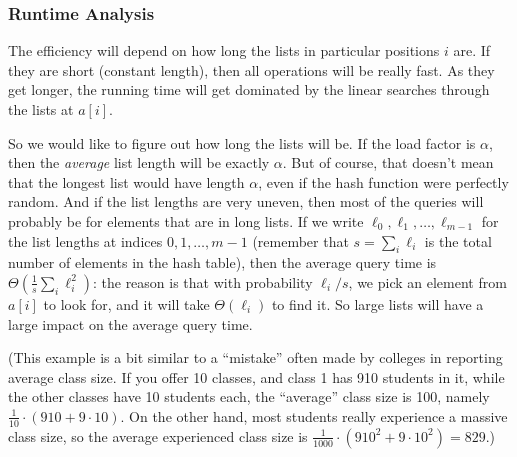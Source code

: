 \subsubsection{Runtime Analysis}
The efficiency will depend on how long the lists in
particular positions $i$ are. 
If they are short (constant length), then all operations will be
really fast. As they get longer, the running time will get dominated
by the linear searches through the lists at $a[i]$.

So we would like to figure out how long the lists will be.
If the load factor is $\alpha$, then the \emph{average} list length
will be exactly $\alpha$. But of course, that doesn't mean that the
longest list would have length $\alpha$, even if the hash function were
perfectly random. 
And if the list lengths are very uneven, then most of the queries will
probably be for elements that are in long lists. 
If we write $\ell_0, \ell_1, \ldots, \ell_{m-1}$ for the list lengths
at indices $0, 1, \ldots, m-1$ (remember that $s=\sum_i \ell_i$ is the
total number of elements in the hash table), then the average query time is
$\Theta(\frac{1}{s} \sum_{i} \ell_i^2)$: the reason is that with probability 
$\ell_i/s$, we pick an element from $a[i]$ to look for, and it will
take $\Theta(\ell_i)$ to find it. So large lists will have a large
impact on the average query time.

(This example is a bit similar to a ``mistake'' often made by colleges
in reporting average class size. If you offer 10 classes, and class 1
has 910 students in it, while the other classes have 10 students each,
the ``average'' class size is 100, namely $\frac{1}{10} \cdot (910 +
9\cdot 10)$. On the other hand, most students really experience a
massive class size, so the average experienced class size is 
$\frac{1}{1000} \cdot (910^2 + 9 \cdot 10^2) = 829$.)

